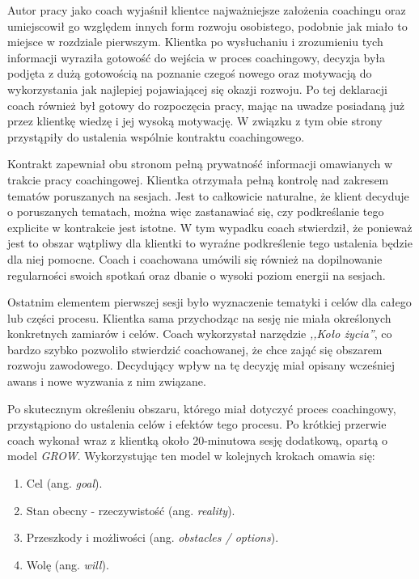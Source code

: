 Autor pracy jako coach wyjaśnił klientce najważniejsze założenia coachingu oraz umiejscowił go względem innych form rozwoju osobistego, podobnie jak miało to miejsce
w rozdziale pierwszym. Klientka po wysłuchaniu i zrozumieniu tych informacji wyraziła gotowość do wejścia w proces coachingowy, decyzja była podjęta
z dużą gotowością na poznanie czegoś nowego oraz motywacją do wykorzystania jak najlepiej pojawiającej się okazji rozwoju. Po tej deklaracji coach również
był gotowy do rozpoczęcia pracy, mając na uwadze posiadaną już przez klientkę wiedzę i jej wysoką motywację. W związku z tym obie strony przystąpiły
do ustalenia wspólnie kontraktu coachingowego.

Kontrakt zapewniał obu stronom pełną prywatność informacji omawianych w trakcie pracy coachingowej. Klientka otrzymała pełną kontrolę nad zakresem tematów
poruszanych na sesjach. Jest to całkowicie naturalne, że klient decyduje o poruszanych tematach, można więc zastanawiać się, czy podkreślanie tego explicite
w kontrakcie jest istotne. W tym wypadku coach stwierdził, że ponieważ jest to obszar wątpliwy dla klientki to wyraźne podkreślenie tego ustalenia
będzie dla niej pomocne. Coach i coachowana umówili się również na dopilnowanie regularności swoich spotkań oraz dbanie o wysoki poziom energii na sesjach.

Ostatnim elementem pierwszej sesji było wyznaczenie tematyki i celów dla całego lub części procesu. Klientka sama przychodząc na sesję nie miała określonych
konkretnych zamiarów i celów. Coach wykorzystał narzędzie \emph{,,Koło życia''}, co bardzo szybko pozwoliło stwierdzić coachowanej, że chce zająć się obszarem
rozwoju zawodowego. Decydujący wpływ na tę decyzję miał opisany wcześniej awans i nowe wyzwania z nim związane.

Po skutecznym określeniu obszaru, którego miał dotyczyć proces coachingowy, przystąpiono do ustalenia celów i efektów tego procesu. Po krótkiej przerwie
coach wykonał wraz z klientką około 20-minutowa sesję dodatkową, opartą o model \emph{GROW}. Wykorzystując ten model w kolejnych krokach omawia się:
\begin{enumerate}
  \item Cel (ang. \emph{goal}).
  \item Stan obecny - rzeczywistość (ang. \emph{reality}).
  \item Przeszkody i możliwości (ang. \emph{obstacles / options}).
  \item Wolę (ang. \emph{will}).
\end{enumerate}

